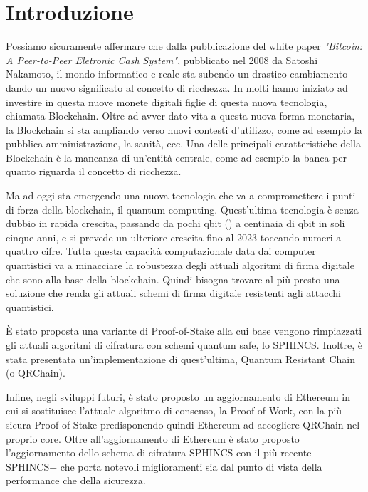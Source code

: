 \chapter*{Introduzione}
Possiamo sicuramente affermare che dalla pubblicazione del white paper \textit{"Bitcoin: A Peer-to-Peer Eletronic Cash System"}, pubblicato nel 2008 da Satoshi Nakamoto, il mondo informatico e reale sta subendo un drastico cambiamento dando un nuovo significato al concetto di ricchezza. In molti hanno iniziato ad investire in questa nuove monete digitali figlie di questa nuova tecnologia, chiamata Blockchain. Oltre ad avver dato vita a questa nuova forma monetaria, la Blockchain si sta ampliando verso nuovi contesti d'utilizzo, come ad esempio la pubblica amministrazione, la sanità, ecc. Una delle principali caratteristiche della Blockchain è la mancanza di un'entità centrale, come ad esempio la banca per quanto riguarda il concetto di ricchezza.

Ma ad oggi sta emergendo una nuova tecnologia che va a compromettere i punti di forza della blockchain, il quantum computing. Quest'ultima tecnologia è senza dubbio in rapida crescita, passando da pochi qbit () a centinaia di qbit in soli cinque anni, e si prevede un ulteriore crescita fino al 2023 toccando numeri a quattro cifre. Tutta questa capacità computazionale data dai computer quantistici va a minacciare la robustezza degli attuali algoritmi di firma digitale che sono alla base della blockchain. Quindi bisogna trovare al più presto una soluzione che renda gli attuali schemi di firma digitale resistenti agli attacchi quantistici.

È stato proposta una variante di Proof-of-Stake alla cui base vengono rimpiazzati gli attuali algoritmi di cifratura con schemi quantum safe, lo SPHINCS. Inoltre, è stata presentata un'implementazione di quest'ultima, Quantum Resistant Chain (o QRChain).

Infine, negli sviluppi futuri, è stato proposto un aggiornamento di Ethereum in cui si sostituisce l'attuale algoritmo di consenso, la Proof-of-Work, con la più sicura Proof-of-Stake predisponendo quindi Ethereum ad accogliere QRChain nel proprio core. Oltre all'aggiornamento di Ethereum è stato proposto l'aggiornamento dello schema di cifratura SPHINCS con il più recente SPHINCS+ che porta notevoli miglioramenti sia dal punto di vista della performance che della sicurezza.

